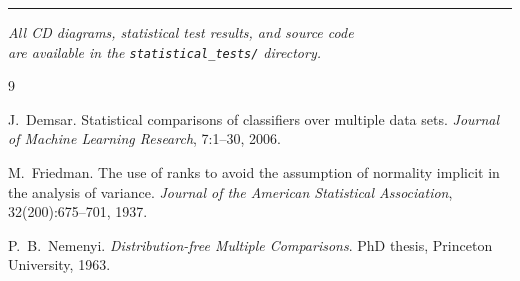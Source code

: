 \documentclass[11pt,a4paper]{article}
\begin{document}
\vspace{12pt}

\begin{center}
\rule{0.4\textwidth}{0.5pt}
\end{center}

\begin{center}
\small
\textit{All CD diagrams, statistical test results, and source code \\
are available in the \texttt{statistical\_tests/} directory.}
\end{center}


\begin{thebibliography}{9}

J.~Demsar.
\newblock Statistical comparisons of classifiers over multiple data sets.
\newblock \textit{Journal of Machine Learning Research}, 7:1--30, 2006.

M.~Friedman.
\newblock The use of ranks to avoid the assumption of normality implicit in the
  analysis of variance.
\newblock \textit{Journal of the American Statistical Association},
  32(200):675--701, 1937.

P.~B.~Nemenyi.
\newblock \textit{Distribution-free Multiple Comparisons}.
\newblock PhD thesis, Princeton University, 1963.

\end{thebibliography}
\end{document}
